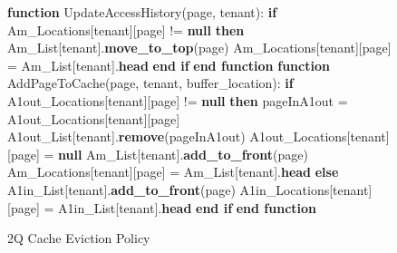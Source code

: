 \begin{figure}[htbp]
    \centering
    \begin{minipage}{\linewidth}
    \begin{algorithm}[H]
        \caption{2Q Cache Eviction Policy}
        \begin{algorithmic}
            \STATE \textbf{function} UpdateAccessHistory(page, tenant):
            \STATE \hspace{\algorithmicindent} \textbf{if} Am\_Locations[tenant][page] != \textbf{null} \textbf{then}
            \STATE \hspace{\algorithmicindent} \hspace{\algorithmicindent} Am\_List[tenant].\textbf{move\_to\_top}(page)
            \STATE \hspace{\algorithmicindent} \hspace{\algorithmicindent} Am\_Locations[tenant][page] = Am\_List[tenant].\textbf{head}
            \STATE \hspace{\algorithmicindent} \textbf{end if}
            \STATE \textbf{end function}
            \STATE
            \STATE \textbf{function} AddPageToCache(page, tenant, buffer\_location):
            \STATE \hspace{\algorithmicindent} \textbf{if} A1out\_Locations[tenant][page] != \textbf{null} \textbf{then}
            \STATE \hspace{\algorithmicindent} \hspace{\algorithmicindent} pageInA1out = A1out\_Locations[tenant][page]
            \STATE \hspace{\algorithmicindent} \hspace{\algorithmicindent} A1out\_List[tenant].\textbf{remove}(pageInA1out)
            \STATE \hspace{\algorithmicindent} \hspace{\algorithmicindent} A1out\_Locations[tenant][page] = \textbf{null}
            \STATE \hspace{\algorithmicindent} \hspace{\algorithmicindent} Am\_List[tenant].\textbf{add\_to\_front}(page)
            \STATE \hspace{\algorithmicindent} \hspace{\algorithmicindent} Am\_Locations[tenant][page] = Am\_List[tenant].\textbf{head}
            \STATE \hspace{\algorithmicindent} \textbf{else}
            \STATE \hspace{\algorithmicindent} \hspace{\algorithmicindent} A1in\_List[tenant].\textbf{add\_to\_front}(page)
            \STATE \hspace{\algorithmicindent} \hspace{\algorithmicindent} A1in\_Locations[tenant][page] = A1in\_List[tenant].\textbf{head}
            \STATE \hspace{\algorithmicindent} \textbf{end if}
            \STATE \textbf{end function}


\end{algorithmic}
\end{algorithm}
\end{minipage}
\end{figure}
